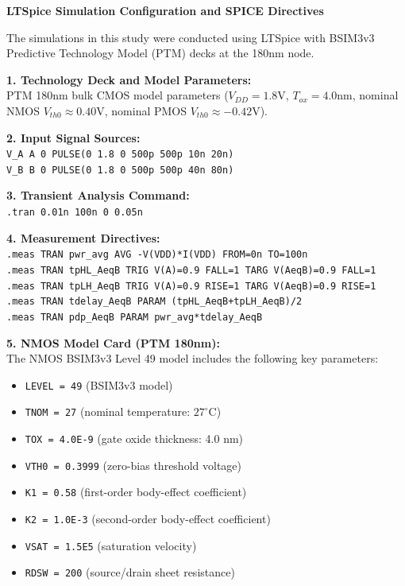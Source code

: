 \documentclass[12pt,a4paper,oneside]{report}
\begin{document}
\noindent\textbf{LTSpice Simulation Configuration and SPICE Directives}

\vspace{0.3cm}
\noindent The simulations in this study were conducted using LTSpice with BSIM3v3 Predictive Technology Model (PTM) decks at the 180nm node.

\vspace{0.3cm}
\noindent\textbf{1. Technology Deck and Model Parameters:}\\
PTM 180nm bulk CMOS model parameters ($V_{DD} = 1.8\text{V}$, $T_{ox} = 4.0\text{nm}$, nominal NMOS $V_{th0} \approx 0.40\text{V}$, nominal PMOS $V_{th0} \approx -0.42\text{V}$).

\vspace{0.3cm}
\noindent\textbf{2. Input Signal Sources:}\\
\texttt{V\_A A 0 PULSE(0 1.8 0 500p 500p 10n 20n)}\\
\texttt{V\_B B 0 PULSE(0 1.8 0 500p 500p 40n 80n)}

\vspace{0.3cm}
\noindent\textbf{3. Transient Analysis Command:}\\
\texttt{.tran 0.01n 100n 0 0.05n}

\vspace{0.3cm}
\noindent\textbf{4. Measurement Directives:}\\
\texttt{.meas TRAN pwr\_avg AVG -V(VDD)*I(VDD) FROM=0n TO=100n}\\
\texttt{.meas TRAN tpHL\_AeqB TRIG V(A)=0.9 FALL=1 TARG V(AeqB)=0.9 FALL=1}\\
\texttt{.meas TRAN tpLH\_AeqB TRIG V(A)=0.9 RISE=1 TARG V(AeqB)=0.9 RISE=1}\\
\texttt{.meas TRAN tdelay\_AeqB PARAM (tpHL\_AeqB+tpLH\_AeqB)/2}\\
\texttt{.meas TRAN pdp\_AeqB PARAM pwr\_avg*tdelay\_AeqB}

\vspace{0.5cm}
\noindent\textbf{5. NMOS Model Card (PTM 180nm):}\\
The NMOS BSIM3v3 Level 49 model includes the following key parameters:
\begin{itemize}
\item \texttt{LEVEL = 49} (BSIM3v3 model)
\item \texttt{TNOM = 27} (nominal temperature: $27^\circ\text{C}$)
\item \texttt{TOX = 4.0E-9} (gate oxide thickness: 4.0 nm)
\item \texttt{VTH0 = 0.3999} (zero-bias threshold voltage)
\item \texttt{K1 = 0.58} (first-order body-effect coefficient)
\item \texttt{K2 = 1.0E-3} (second-order body-effect coefficient)
\item \texttt{VSAT = 1.5E5} (saturation velocity)
\item \texttt{RDSW = 200} (source/drain sheet resistance)
\end{itemize}
\end{document}
